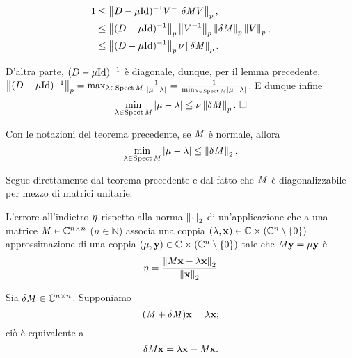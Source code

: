 \begin{align*}
  1
  &\leq \Norm{\DiagonalMatrix - \VarEigenvalue\Identity)^{-1} V^{-1}
  \Perturbation{\Matrix} V}[p],\\
  &\leq \Norm{(\DiagonalMatrix - \VarEigenvalue\Identity)^{-1}}[p]
  \Norm{V^{-1}}[p] \Norm{\Perturbation{\Matrix}}[p] \Norm{V}[p],\\
  &\leq \Norm{(\DiagonalMatrix - \VarEigenvalue\Identity)^{-1}}[p]
  \VarMatrixConditionNumber \Norm{\Perturbation{\Matrix}}[p].
\end{align*}
\par D'altra parte, $(\DiagonalMatrix - \VarEigenvalue \Identity)^{-1}$ \`e
diagonale, dunque, per il lemma precedente,
$\Norm{(\DiagonalMatrix - \VarEigenvalue\Identity)^{-1}}[p]
= \max_{\Eigenvalue \in \Spectrum{\Matrix}} \frac{1}{
  \AbsoluteValue{\VarEigenvalue - \Eigenvalue}}
= \frac{1}{\min_{\Eigenvalue \in \Spectrum{\Matrix}}
  \AbsoluteValue{\VarEigenvalue - \Eigenvalue}}$.
E dunque infine
\[
  \min_{\Eigenvalue \in \Spectrum{\Matrix}} 
  \AbsoluteValue{\VarEigenvalue - \Eigenvalue}
  \leq \VarMatrixConditionNumber \Norm{\Perturbation{\Matrix}}[p].\text{ \EndProof}
\]
\begin{Corollary}
  Con le notazioni del teorema precedente, se $\mathit{M}$ \`e normale, allora
  \[
    \min_{\Eigenvalue \in \Spectrum{\Matrix}}
    \AbsoluteValue{\VarEigenvalue - \Eigenvalue}
    \leq \Norm{\Perturbation{\Matrix}}[2].
  \]
\end{Corollary}
\Proof Segue direttamente dal teorema precedente e dal fatto che $\mathit{M}$ \`e
diagonalizzabile per mezzo di matrici unitarie. \EndProof
\begin{Theorem}
  L'errore all'indietro $\eta$ rispetto alla norma $\Norm{\cdot}[2]$
  di un'applicazione che a una matrice
  $\mathit{M} \in \mathbb{C}^{n \times n}$ ($n \in \mathbb{N}$) associa una coppia
  $(\Eigenvalue,\Eigenvector) \in \mathbb{C} \times (\NotZero{\mathbb{C}^n})$
  approssimazione di una coppia
  $(\VarEigenvalue,\VarEigenvector) \in
    \mathbb{C} \times (\NotZero{\mathbb{C}^n})$
  tale che $\Matrix\VarEigenvector = \VarEigenvalue\VarEigenvector$
  \`e
  \[
    \BackwardError
    = \frac{\Norm{\Matrix\Eigenvector - \Eigenvalue\Eigenvector}[2]}
      {\Norm{\Eigenvector}[2]}
  \]
\end{Theorem}
\Proof Sia $\Perturbation{\Matrix} \in \mathbb{C}^{n \times n}$.
Supponiamo
\[
  (\Matrix + \Perturbation{\Matrix})\Eigenvector = \Eigenvalue\Eigenvector;
\]
ci\`o \`e equivalente a
\[
  \Perturbation{\Matrix}\Eigenvector
  = \Eigenvalue\Eigenvector - \Matrix\Eigenvector.
\]
